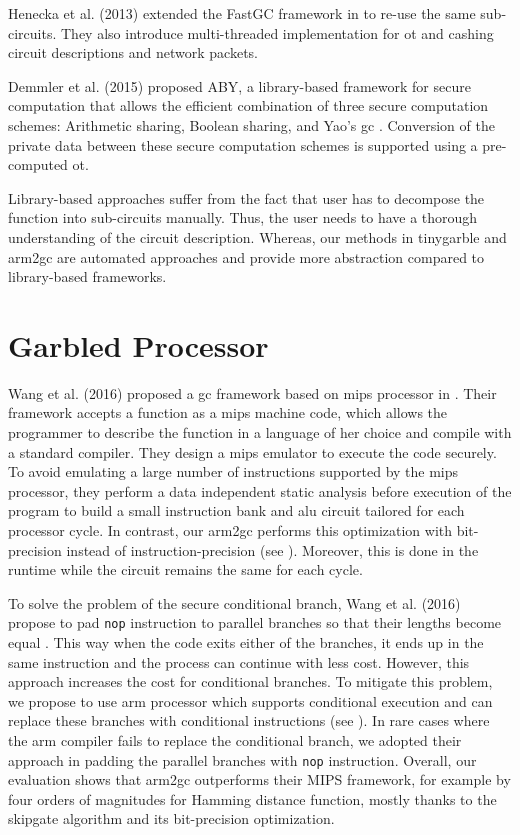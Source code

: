 Henecka et al. (2013) extended the FastGC framework in \cite{henecka2013faster} to re-use the same sub-circuits.
They also introduce multi-threaded implementation for \acrshort{ot} and cashing circuit descriptions and network packets.

Demmler et al. (2015) proposed ABY, a library-based framework for secure computation that allows the efficient combination of three secure computation schemes: Arithmetic sharing, Boolean sharing, and Yao’s \acrshort{gc} \cite{demmler2015aby}.
Conversion of the private data between these secure computation schemes is supported using a pre-computed \acrshort{ot}.

Library-based approaches suffer from the fact that user has to decompose the function into sub-circuits manually.
Thus, the user needs to have a thorough understanding of the circuit description.
Whereas, our methods in \gls{tinygarble} and \gls{arm2gc} are automated approaches and provide more abstraction compared to library-based frameworks.

\section{Garbled Processor}\label{sec:related-processor}
Wang et al. (2016) proposed a \acrshort{gc} framework based on \gls{mips} processor in \cite{wang2016secure}.
Their framework accepts a function as a \gls{mips} machine code, which allows the programmer to describe the function in a language of her choice and compile with a standard compiler.
They design a \gls{mips} emulator to execute the code securely.
To avoid emulating a large number of instructions supported by the \gls{mips} processor, they perform a data independent static analysis before execution of the program to build a small instruction bank and \acrshort{alu} circuit tailored for each processor cycle.
In contrast, our \gls{arm2gc} performs this optimization with bit-precision instead of instruction-precision (see ).
Moreover, this is done in the runtime while the circuit remains the same for each cycle.

To solve the problem of the secure conditional branch, Wang et al. (2016) propose to pad \texttt{nop} instruction to parallel branches so that their lengths become equal \cite{wang2016secure}.
This way when the code exits either of the branches, it ends up in the same instruction and the process can continue with less cost.
However, this approach increases the cost for conditional branches.
To mitigate this problem, we propose to use \gls{arm} processor which supports conditional execution and can replace these branches with conditional instructions (see ).
In rare cases where the \gls{arm} compiler fails to replace the conditional branch, we adopted their approach in padding the parallel branches with \texttt{nop} instruction.
Overall, our evaluation shows that \gls{arm2gc} outperforms their MIPS framework, for example by four orders of magnitudes for Hamming distance function, mostly thanks to the \gls{skipgate} algorithm and its bit-precision optimization.

